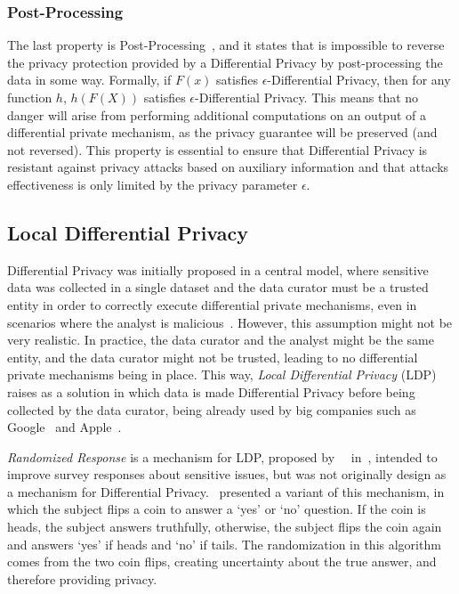 \subsubsection{Post-Processing}\label{subsubsec:post_processing}

The last property is Post-Processing~\cite{DP_Book, AlgFoundationsDP}, and it states that is impossible to reverse the privacy protection provided by a Differential Privacy by post-processing the data in some way. Formally, if \(F(x)\) satisfies \(\epsilon\)-Differential Privacy, then for any function \(h\), \(h(F(X))\) satisfies \(\epsilon\)-Differential Privacy. This means that no danger will arise from performing additional computations on an output of a differential private mechanism, as the privacy guarantee will be preserved (and not reversed). This property is essential to ensure that Differential Privacy is resistant against privacy attacks based on auxiliary information and that attacks effectiveness is only limited by the privacy parameter \(\epsilon\).

\subsection{Local Differential Privacy}\label{subsec:local_differential_privacy}

Differential Privacy was initially proposed in a central model, where sensitive data was collected in a single dataset and the data curator must be a trusted entity in order to correctly execute differential private mechanisms, even in scenarios where the analyst is malicious~\cite{DP_Book}. However, this assumption might not be very realistic. In practice, the data curator and the analyst might be the same entity, and the data curator might not be trusted, leading to no differential private mechanisms being in place. This way, \textit{Local Differential Privacy} (LDP) raises as a solution in which data is made Differential Privacy before being collected by the data curator, being already used by big companies such as Google~\cite{RAPPOR} and Apple~\cite{AppleDP}. 

\textit{Randomized Response} is a mechanism for LDP, proposed by~\citeauthor{RandomizedResponse}~\cite{RandomizedResponse} in~\citeyear{RandomizedResponse}, intended to improve survey responses about sensitive issues, but was not originally design as a mechanism for Differential Privacy.~\citeauthor{AlgFoundationsDP} presented a variant of this mechanism, in which the subject flips a coin to answer a `yes' or `no' question. If the coin is heads, the subject answers truthfully, otherwise, the subject flips the coin again and answers `yes' if heads and `no' if tails. The randomization in this algorithm comes from the two coin flips, creating uncertainty about the true answer, and therefore providing privacy.


